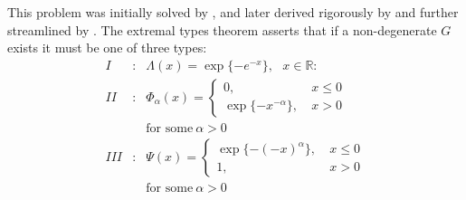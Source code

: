 This problem was initially solved by \cite{fisher1928limiting}, and later derived rigorously by \cite{gnedenko1943distribution} and further streamlined by \cite{dehaan1970regular}. The extremal types theorem asserts that if a non-degenerate $G$ exists it must be one of three types:
\begin{eqnarray*}
I&:& \Lambda (x) = \exp\{-e^{-x}\},\ \ \ x\in\mathbb{R}: \\
II&:& \Phi_{\alpha}(x) =
\begin{cases}
 0, & \ x\leq 0 \\
 \exp\{-x^{-\alpha}\}, & \ x>0
\end{cases}
\\&& \text{for some}\ \alpha >0\\
III&:& \Psi(x) =
\begin{cases}
 \exp\{-(-x)^{\alpha}\}, & \ x\leq 0 \\
 1, & \ x>0
\end{cases}
\\&& \text{for some}\ \alpha >0
\end{eqnarray*}
